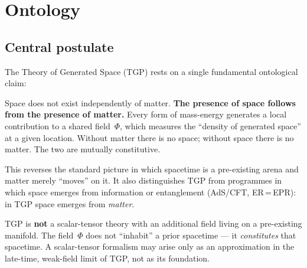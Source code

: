 \section{Ontology}\label{sec:ontologia}

\subsection{Central postulate}

The Theory of Generated Space (TGP) rests on a single fundamental
ontological claim:

\begin{axiom}\label{ax:przestrzen}
Space does not exist independently of matter.
\textbf{The presence of space follows from the presence of matter.}
Every form of mass-energy generates a local contribution to a shared
field~$\Phi$, which measures the ``density of generated space'' at a
given location.  Without matter there is no space; without space there
is no matter.  The two are mutually constitutive.
\end{axiom}

This reverses the standard picture in which spacetime is a pre-existing
arena and matter merely ``moves'' on it.  It also distinguishes TGP from
programmes in which space emerges from information or entanglement
(AdS/CFT, ER\,=\,EPR): in TGP space emerges from \emph{matter}.

\begin{remark}
TGP is \textbf{not} a scalar-tensor theory with an additional field
living on a pre-existing manifold.  The field~$\Phi$ does not ``inhabit''
a prior spacetime --- it \emph{constitutes} that spacetime.
A scalar-tensor formalism may arise only as an approximation in the
late-time, weak-field limit of TGP, not as its foundation.
\end{remark}

